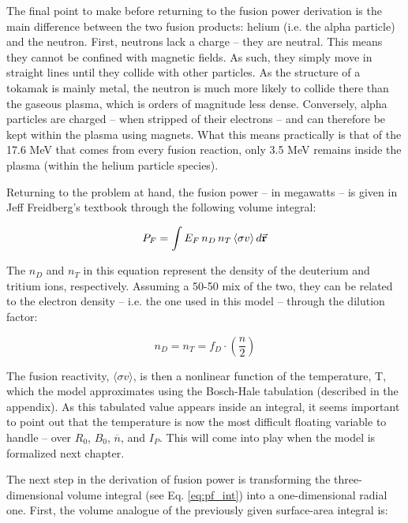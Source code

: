 The final point to make before returning to the fusion power derivation is the main difference between the two fusion products: helium (i.e. the alpha particle) and the neutron. First, neutrons lack a charge -- they are neutral. This means they cannot be confined with magnetic fields. As such, they simply move in straight lines until they collide with other particles. As the structure of a tokamak is mainly metal, the neutron is much more likely to collide there than the gaseous plasma, which is orders of magnitude less dense. Conversely, alpha particles are charged -- when stripped of their electrons -- and can therefore be kept within the plasma using magnets. What this means practically is that of the 17.6 MeV that comes from every fusion reaction, only 3.5 MeV remains inside the plasma (within the helium particle species).
 
 Returning to the problem at hand, the fusion power -- in megawatts -- is given in Jeff Freidberg's textbook through the following volume integral:
 
 \begin{equation}
 	\label{eq:pf_int}
 	P_F = \int E_F \, n_D \, n_T \, \langle \sigma v \rangle \, d \vec{\bold{r}}
 \end{equation}
 
 The $n_D$ and $n_T$ in this equation represent the density of the deuterium and tritium ions, respectively. Assuming a 50-50 mix of the two, they can be related to the electron density -- i.e. the one used in this model -- through the dilution factor:
 
 \begin{equation}
 	n_D = n_T = f_D \cdot \left( \frac{n}{2} \right)
 \end{equation}
 
 The fusion reactivity, $\langle \sigma v \rangle$, is then a nonlinear function of the temperature, T, which the model approximates using the Bosch-Hale tabulation (described in the appendix). As this tabulated value appears inside an integral, it seems important to point out that the temperature is now the most difficult floating variable to handle -- over $R_0$, $B_0$, $\overline n$, and $I_P$. This will come into play when the model is formalized next chapter.
 
 The next step in the derivation of fusion power is transforming the three-dimensional volume integral (see Eq. \ref{eq:pf_int}) into a one-dimensional radial one. First, the volume analogue of the previously given surface-area integral is:
 
